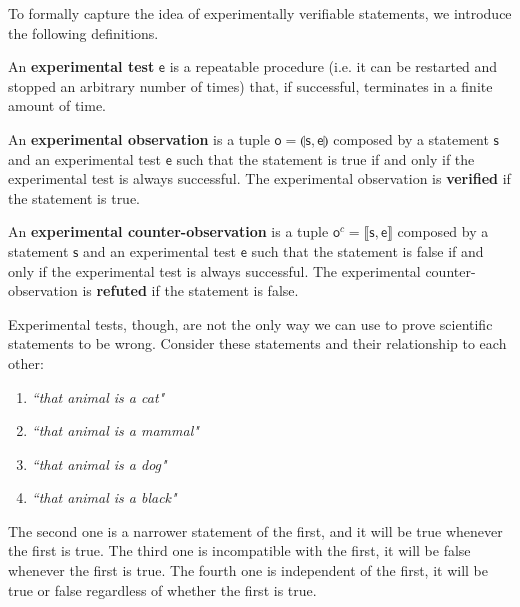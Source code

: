 \documentclass[11pt,letterpaper,fleqn]{memoir} %
\begin{document}
\begin{mathSection}

To formally capture the idea of experimentally verifiable statements, we introduce the following definitions.

\begin{defn}
	An \textbf{experimental test} $\mathsf{e}$ is a repeatable procedure (i.e. it can be restarted and stopped an arbitrary number of times) that, if successful, terminates in a finite amount of time.
\end{defn}

\begin{defn}
	An \textbf{experimental observation} is a tuple $\mathsf{o} = \llparenthesis \mathsf{s}, \mathsf{e} \rrparenthesis$ composed by a statement $\mathsf{s}$ and an experimental test $\mathsf{e}$ such that the statement is true if and only if the  experimental test is always successful. The experimental observation is \textbf{verified} if the statement is true.
\end{defn}

\begin{defn}
	An \textbf{experimental counter-observation} is a tuple $\mathsf{o}^c= \llbracket \mathsf{s}, \mathsf{e} \rrbracket$ composed by a statement $\mathsf{s}$ and an experimental test $\mathsf{e}$ such that the statement is false if and only if the experimental test is always successful. The experimental counter-observation is \textbf{refuted} if the statement is false.
\end{defn}
\end{mathSection}

Experimental tests, though, are not the only way we can use to prove scientific statements to be wrong. Consider these statements and their relationship to each other:
\begin{enumerate}
	\item \emph{``that animal is a cat"}
	\item \emph{``that animal is a mammal"}
	\item \emph{``that animal is a dog"}
	\item \emph{``that animal is a black"}
\end{enumerate}
The second one is a narrower statement of the first, and it will be true whenever the first is true. The third one is incompatible with the first, it will be false whenever the first is true. The fourth one is independent of the first, it will be true or false regardless of whether the first is true.
\end{document}
